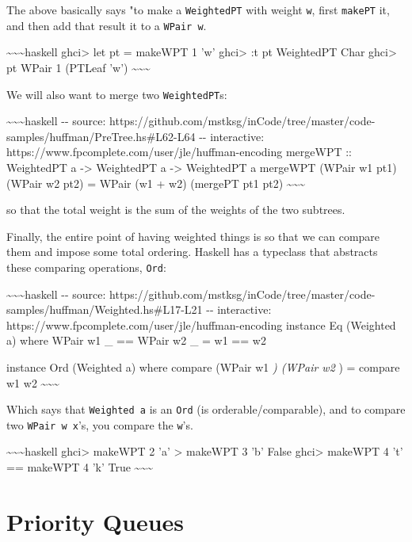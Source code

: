 \documentclass[]{article}
\begin{document}
The above basically says "to make a \texttt{WeightedPT} with weight \texttt{w},
first \texttt{makePT} it, and then add that result it to a \texttt{WPair\ w}.

\textasciitilde{}\textasciitilde{}\textasciitilde{}haskell ghci\textgreater{}
let pt = makeWPT 1 'w' ghci\textgreater{} :t pt WeightedPT Char
ghci\textgreater{} pt WPair 1 (PTLeaf 'w')
\textasciitilde{}\textasciitilde{}\textasciitilde{}

We will also want to merge two \texttt{WeightedPT}s:

\textasciitilde{}\textasciitilde{}\textasciitilde{}haskell -\/- source:
https://github.com/mstksg/inCode/tree/master/code-samples/huffman/PreTree.hs\#L62-L64
-\/- interactive: https://www.fpcomplete.com/user/jle/huffman-encoding mergeWPT
:: WeightedPT a -\textgreater{} WeightedPT a -\textgreater{} WeightedPT a
mergeWPT (WPair w1 pt1) (WPair w2 pt2) = WPair (w1 + w2) (mergePT pt1 pt2)
\textasciitilde{}\textasciitilde{}\textasciitilde{}

so that the total weight is the sum of the weights of the two subtrees.

Finally, the entire point of having weighted things is so that we can compare
them and impose some total ordering. Haskell has a typeclass that abstracts
these comparing operations, \texttt{Ord}:

\textasciitilde{}\textasciitilde{}\textasciitilde{}haskell -\/- source:
https://github.com/mstksg/inCode/tree/master/code-samples/huffman/Weighted.hs\#L17-L21
-\/- interactive: https://www.fpcomplete.com/user/jle/huffman-encoding instance
Eq (Weighted a) where WPair w1 \_ == WPair w2 \_ = w1 == w2

instance Ord (Weighted a) where compare (WPair w1 \emph{) (WPair w2 }) = compare
w1 w2 \textasciitilde{}\textasciitilde{}\textasciitilde{}

Which says that \texttt{Weighted\ a} is an \texttt{Ord} (is
orderable/comparable), and to compare two \texttt{WPair\ w\ x}'s, you compare
the \texttt{w}'s.

\textasciitilde{}\textasciitilde{}\textasciitilde{}haskell ghci\textgreater{}
makeWPT 2 'a' \textgreater{} makeWPT 3 'b' False ghci\textgreater{} makeWPT 4
't' == makeWPT 4 'k' True \textasciitilde{}\textasciitilde{}\textasciitilde{}

\section{Priority Queues}
\end{document}
